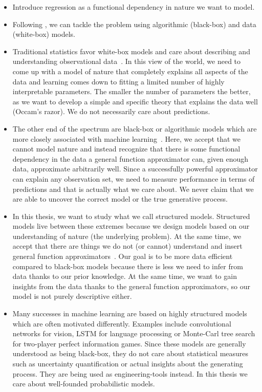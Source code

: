 \begin{itemize}
    \item Introduce regression as a functional dependency in nature we want to model.
    \item Following \textcite{breiman_statistical_2001,shmueli_explain_2010}, we can tackle the problem using algorithmic (black-box) and data (white-box) models.
    \item Traditional statistics favor white-box models and care about describing and understanding observational data~\parencite{giulio_d._agostini_bayesian_2003,andrew_gelman_bayesian_2013,casella_statistical_2002,cox_planning_1958}.
          In this view of the world, we need to come up with a model of nature that completely explains all aspects of the data and learning comes down to fitting a limited number of highly interpretable parameters.
          The smaller the number of parameters the better, as we want to develop a simple and specific theory that explains the data well (Occam's razor).
          We do not necessarily care about predictions.
    \item The other end of the spectrum are black-box or algorithmic models which are more closely associated with machine learning~\parencite{mitchell_machine_1997,goodfellow_deep_2016}.
          Here, we accept that we cannot model nature and instead recognize that there is some functional dependency in the data a general function approximator can, given enough data, approximate arbitrarily well.
          Since a successfully powerful approximator can explain any observation set, we need to measure performance in terms of predictions and that is actually what we care about.
          We never claim that we are able to uncover the correct model or the true generative process.
    \item In this thesis, we want to study what we call structured models.
          Structured models live between these extremes because we design models based on our understanding of nature (the underlying problem).
          At the same time, we accept that there are things we do not (or cannot) understand and insert general function approximators~\parencite{friedman_data_1998}.
          Our goal is to be more data efficient compared to black-box models because there is less we need to infer from data thanks to our prior knowledge.
          At the same time, we want to gain insights from the data thanks to the general function approximators, so our model is not purely descriptive either.
    \item Many successes in machine learning are based on highly structured models which are often motivated differently.
          Examples include convolutional networks for vision, LSTM for language processing or Monte-Carl tree search for two-player perfect information games.
          Since these models are generally understood as being black-box, they do not care about statistical measures such as uncertainty quantification or actual insights about the generating process.
          They are being used as engineering-tools instead.
          In this thesis we care about well-founded probabilistic models.
\end{itemize}


